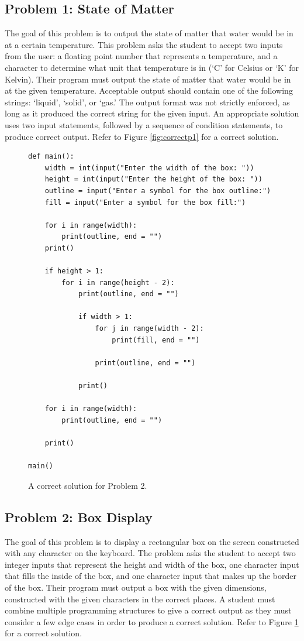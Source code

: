 \subsection{Problem 1: State of Matter}
The goal of this problem is to output the state of matter that water would be in at a certain temperature. This problem asks the student to accept two inputs from the user: a floating point number that represents a temperature, and a character to determine what unit that temperature is in (`C' for Celsius or `K' for Kelvin). Their program must output the state of matter that water would be in at the given temperature. Acceptable output should contain one of the following strings: `liquid', `solid', or `gas.' The output format was not strictly enforced, as long as it produced the correct string for the given input. An appropriate solution uses two input statements, followed by a sequence of condition statements, to produce correct output. Refer to Figure \ref{fig:correctp1} for a correct solution.


\begin{figure}[ht]
\begin{lstlisting}[numbers=none]
def main():
    width = int(input("Enter the width of the box: "))
    height = int(input("Enter the height of the box: "))
    outline = input("Enter a symbol for the box outline:")
    fill = input("Enter a symbol for the box fill:")

    for i in range(width):
        print(outline, end = "")
    print()
    
    if height > 1:
        for i in range(height - 2):
            print(outline, end = "")
            
            if width > 1:
                for j in range(width - 2):
                    print(fill, end = "")
                    
                print(outline, end = "")
            
            print()

    for i in range(width):
        print(outline, end = "")
    
    print()

main()
  \end{lstlisting}
  \caption{A correct solution for Problem 2.}
  \label{fig:correctp2}
\end{figure}

\subsection{Problem 2: Box Display}
The goal of this problem is to display a rectangular box on the screen constructed with any character on the keyboard. The problem asks the student to accept two integer inputs that represent the height and width of the box, one character input that fills the inside of the box, and one character input that makes up the border of the box. Their program must output a box with the given dimensions, constructed with the given characters in the correct places. A student must combine multiple programming structures to give a correct output as they must consider a few edge cases in order to produce a correct solution. Refer to Figure \ref{fig:correctp2} for a correct solution.

